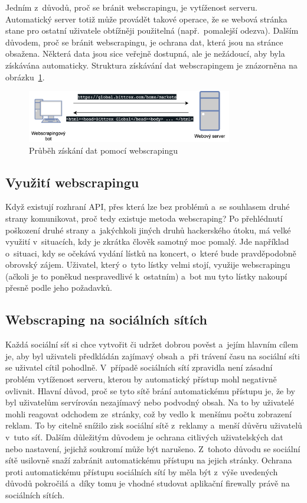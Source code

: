 Jedním z~důvodů, proč se bránit webscrapingu, je vytíženost serveru. Automatický server totiž může provádět takové operace, že se webová stránka stane pro ostatní uživatele obtížněji použitelná (např.~pomalejší odezva). Dalším důvodem, proč se bránit webscrapingu, je ochrana dat, která jsou na stránce obsažena. Některá data jsou sice veřejně dostupná, ale je nežádoucí, aby byla získávána automaticky. Struktura získávání dat webscrapingem je znázorněna na obrázku~\ref{img:webscraping}.

\begin{figure}[hbt]
	\centering
	\includegraphics[width=0.8\textwidth]{images/webscraping.png}
	\caption{Průběh získání dat pomocí webscrapingu}
	\label{img:webscraping}
\end{figure}

\subsection*{Využití webscrapingu}
Když existují rozhraní API, přes která lze bez problémů a~se souhlasem druhé strany komunikovat, proč tedy existuje metoda webscraping? Po přehlédnutí poškození druhé strany a~jakýchkoli jiných druhů hackerského útoku, má velké využití v~situacích, kdy je zkrátka člověk samotný moc pomalý. Jde například o~situaci, kdy se očekává vydání lístků na koncert, o~které bude pravděpodobně obrovský zájem. Uživatel, který o~tyto lístky velmi stojí, využije webscrapingu (ačkoli je to poněkud nespravedlivé k~ostatním) a~bot mu tyto lístky nakoupí přesně podle jeho požadavků.

\subsection*{Webscraping na sociálních sítích}
Každá sociální síť si chce vytvořit či udržet dobrou pověst a~jejím hlavním cílem je, aby byl uživateli předkládán zajímavý obsah a~při trávení času na sociální síti se uživatel cítil pohodlně. V~případě sociálních sítí zpravidla není zásadní problém vytíženost serveru, kterou by automatický přístup mohl negativně ovlivnit. Hlavní důvod, proč se tyto sítě brání automatickému přístupu je, že by byl uživatelům servírován nezajímavý nebo podvodný obsah. Na to by uživatelé mohli reagovat odchodem ze~stránky, což by vedlo k~menšímu počtu zobrazení reklam. To by citelně snížilo zisk sociální sítě z~reklamy a~menší důvěru uživatelů v~tuto síť. Dalším důležitým důvodem je ochrana citlivých uživatelských dat nebo nastavení, jejichž soukromí může být narušeno. Z~tohoto důvodu se sociální sítě usilovně snaží zabránit automatickému přístupu na jejich stránky. Ochrana proti automatickému přístupu sociálních sítí by měla být z~výše uvedených důvodů pokročilá a~díky tomu je vhodné studovat aplikační firewally právě na sociálních sítích.

